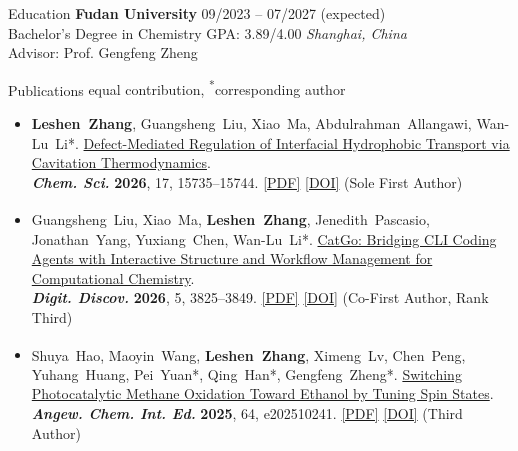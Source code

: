 \documentclass{resume} %
\newcommand{\me}{\textbf{\setbox0\hbox{Leshen Zhang}\rlap{\rule[-2.4pt]{\wd0}{0.9pt}}\box0}} %
\newcommand{\eq}{\textsuperscript{\textdaggerdbl}}
\newcommand{\ptitle}[1]{#1} %
\newcommand{\bluehref}[2]{{\hypersetup{urlcolor=blue}\href{#1}{#2}}} %
\begin{document}
\raggedright{} %

\begin{rSection}{Education}
{\bf Fudan University} \hfill 09/2023 -- 07/2027 (expected) \\
Bachelor's Degree in Chemistry \textbar{} GPA: 3.89/4.00 \hfill \textit{Shanghai, China} \\
Advisor: Prof. Gengfeng Zheng
\end{rSection}

\begin{rSection}{Publications \hfill {\normalfont\footnotesize \textsuperscript{\textdaggerdbl}equal contribution, \textsuperscript{*}corresponding author}}
{\small\begin{itemize}[leftmargin=2.6em,labelsep=0.4em,itemsep=1pt]
  \item[\textbf{[J.1]}] \hypertarget{J.1}{}\me, Guangsheng~Liu, Xiao~Ma, Abdulrahman~Allangawi, Wan-Lu~Li*. \href{https://doi.org/10.1039/D6SC02460B}{\ptitle{Defect-Mediated Regulation of Interfacial Hydrophobic Transport via Cavitation Thermodynamics}}. \\ \textbf{\textit{Chem. Sci.}} \textbf{2026}, 17, 15735--15744. \bluehref{https://leshenzhang.github.io/papers/J1_Zhang2026_ChemSci.pdf}{[PDF]} \bluehref{https://doi.org/10.1039/D6SC02460B}{[DOI]} (Sole First Author)
  \item[\textbf{[J.2]}] \hypertarget{J.2}{}Guangsheng~Liu\eq, Xiao~Ma\eq, \me\eq, Jenedith~Pascasio, Jonathan~Yang, Yuxiang~Chen, Wan-Lu~Li*. \href{https://doi.org/10.1039/D6DD00273K}{\ptitle{CatGo: Bridging CLI Coding Agents with Interactive Structure and Workflow Management for Computational Chemistry}}. \\ \textbf{\textit{Digit. Discov.}} \textbf{2026}, 5, 3825--3849. \bluehref{https://leshenzhang.github.io/papers/J2_Liu2026_DigitDiscov.pdf}{[PDF]} \bluehref{https://doi.org/10.1039/D6DD00273K}{[DOI]} (Co-First Author, Rank Third)
  \item[\textbf{[J.3]}] \hypertarget{J.3}{}Shuya~Hao\eq, Maoyin~Wang\eq, \me, Ximeng~Lv, Chen~Peng, Yuhang~Huang, Pei~Yuan*, Qing~Han*, Gengfeng~Zheng*. \href{https://doi.org/10.1002/anie.202510241}{\ptitle{Switching Photocatalytic Methane Oxidation Toward Ethanol by Tuning Spin States}}. \\ \textbf{\textit{Angew. Chem. Int. Ed.}} \textbf{2025}, 64, e202510241. \bluehref{https://leshenzhang.github.io/papers/J3_Hao2025_AngewChem.pdf}{[PDF]} \bluehref{https://doi.org/10.1002/anie.202510241}{[DOI]} (Third Author)
\end{itemize}}
\end{rSection}
\end{document}
